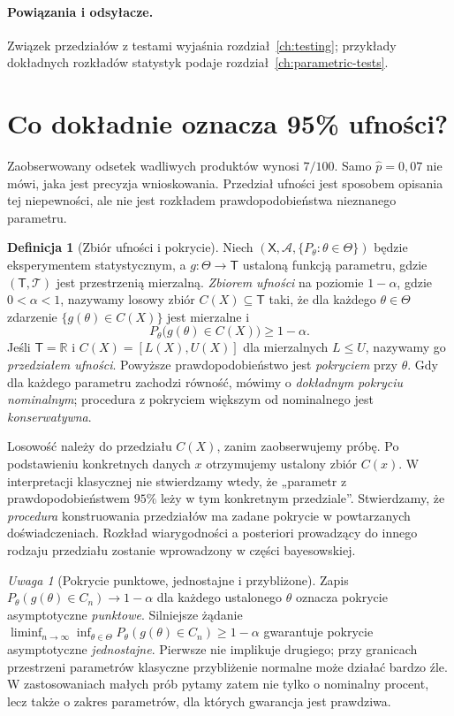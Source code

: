 \documentclass[11pt,a4paper,oneside]{report}
\numberwithin{equation}{chapter}
\theoremstyle{plain}
\theoremstyle{definition}
\newtheorem{definicja}{Definicja}[chapter]
\theoremstyle{remark}
\newtheorem{uwaga}{Uwaga}[chapter]
\newcommand{\R}{\mathbb R}
\begin{document}
\paragraph{Powiązania i odsyłacze.} Związek przedziałów z testami wyjaśnia rozdział~\ref{ch:testing}; przykłady dokładnych rozkładów statystyk podaje rozdział~\ref{ch:parametric-tests}.


\section{Co dokładnie oznacza 95\% ufności?}
Zaobserwowany odsetek wadliwych produktów wynosi $7/100$. Samo
$\widehat p=0{,}07$ nie mówi, jaka jest precyzja wnioskowania.
Przedział ufności jest sposobem opisania tej niepewności, ale
nie jest rozkładem prawdopodobieństwa nieznanego parametru.

\begin{definicja}[Zbiór ufności i pokrycie]\label{def:confidence-set}
Niech $(\mathsf X,\mathcal A,\{P_\theta:\theta\in\Theta\})$
będzie eksperymentem statystycznym, a
$g:\Theta\to\mathsf T$ ustaloną funkcją parametru,
gdzie $(\mathsf T,\mathcal T)$ jest przestrzenią mierzalną.
\emph{Zbiorem ufności} na poziomie $1-\alpha$, gdzie
$0<\alpha<1$, nazywamy losowy zbiór $C(X)\subseteq\mathsf T$
taki, że dla każdego $\theta\in\Theta$ zdarzenie
$\{g(\theta)\in C(X)\}$ jest mierzalne i
\[
 P_\theta\bigl(g(\theta)\in C(X)\bigr)\ge1-\alpha.
\]
Jeśli $\mathsf T=\R$ i $C(X)=[L(X),U(X)]$ dla
mierzalnych $L\le U$, nazywamy go \emph{przedziałem ufności}.
Powyższe prawdopodobieństwo jest \emph{pokryciem} przy $\theta$.
Gdy dla każdego parametru zachodzi równość, mówimy o
\emph{dokładnym pokryciu nominalnym}; procedura z pokryciem
większym od nominalnego jest \emph{konserwatywna}.
\end{definicja}

Losowość należy do przedziału $C(X)$, zanim zaobserwujemy próbę.
Po podstawieniu konkretnych danych $x$ otrzymujemy ustalony zbiór
$C(x)$. W interpretacji klasycznej nie stwierdzamy wtedy, że
„parametr z prawdopodobieństwem $95\%$ leży w tym konkretnym
przedziale”. Stwierdzamy, że \emph{procedura} konstruowania
przedziałów ma zadane pokrycie w powtarzanych doświadczeniach.
Rozkład wiarygodności a posteriori prowadzący do innego rodzaju
przedziału zostanie wprowadzony w części bayesowskiej.

\begin{uwaga}[Pokrycie punktowe, jednostajne i przybliżone]
Zapis $P_\theta(g(\theta)\in C_n)\to1-\alpha$ dla każdego
ustalonego $\theta$ oznacza pokrycie asymptotyczne \emph{punktowe}.
Silniejsze żądanie
$\liminf_{n\to\infty}\inf_{\theta\in\Theta}
P_\theta(g(\theta)\in C_n)\ge1-\alpha$
gwarantuje pokrycie asymptotyczne \emph{jednostajne}.
Pierwsze nie implikuje drugiego; przy granicach przestrzeni
parametrów klasyczne przybliżenie normalne może działać
bardzo źle. W zastosowaniach małych prób pytamy zatem nie tylko
o nominalny procent, lecz także o zakres parametrów, dla których
gwarancja jest prawdziwa.
\end{uwaga}
\end{document}
